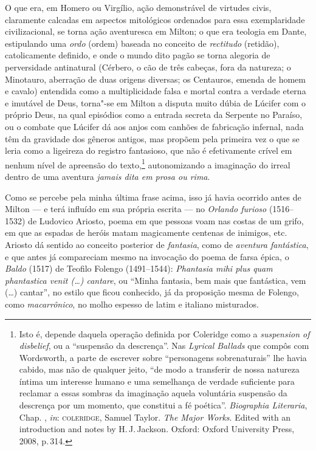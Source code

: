 O que era, em Homero ou Virgílio, ação demonstrável de virtudes civis,
claramente calcadas em aspectos mitológicos ordenados para essa
exemplaridade civilizacional, se torna ação aventuresca em Milton; o que
era teologia em Dante, estipulando uma \emph{ordo} (ordem) baseada no
conceito de \emph{rectitudo} (retidão), catolicamente definido, e onde o
mundo dito pagão se torna alegoria de perversidade antinatural (Cérbero,
o cão de três cabeças, fora da natureza; o Minotauro, aberração de duas
origens diversas; os Centauros, emenda de homem e cavalo) entendida como
a multiplicidade falsa e mortal contra a verdade eterna e imutável de
Deus, torna"-se em Milton a disputa muito dúbia de Lúcifer com o próprio
Deus, na qual episódios como a entrada secreta da Serpente no Paraíso,
ou o combate que Lúcifer dá aos anjos com canhões de fabricação
infernal, nada têm da gravidade dos gêneros antigos, mas propõem pela
primeira vez o que se leria como a ligeireza do registro fantasioso, que
não é efetivamente crível em nenhum nível de apreensão do
texto,\footnote{Isto é, depende daquela operação definida por Coleridge
  como a \emph{suspension of disbelief}, ou a ``suspensão da
  descrença''. Nas \emph{Lyrical Ballads} que compôs com Wordsworth, a
  parte de escrever sobre ``personagens sobrenaturais'' lhe havia
  cabido, mas não de qualquer jeito, ``de modo a transferir de nossa
  natureza íntima um interesse humano e uma semelhança de verdade
  suficiente para reclamar a essas sombras da imaginação aquela
  voluntária suspensão da descrença por um momento, que constitui a fé
  poética''. \emph{Biographia Literaria}, Chap. , \emph{in}:
  \textsc{coleridge}, Samuel Taylor. \emph{The Major Works}. Edited with an
  introduction and notes by H.\,J.\,Jackson. Oxford: Oxford University
  Press, 2008, p.\,314.} autonomizando a imaginação do irreal dentro de
uma aventura \emph{jamais dita em prosa ou rima}.

Como se percebe pela minha última frase acima, isso já havia ocorrido
antes de Milton --- e terá influído em sua própria escrita --- no
\emph{Orlando furioso} (1516--1532) de Ludovico Ariosto, poema em que
pessoas voam nas costas de um grifo, em que as espadas de heróis matam
magicamente centenas de inimigos, etc. Ariosto dá sentido ao conceito
posterior de \emph{fantasia}, como de \emph{aventura fantástica}, e que
antes já compareciam mesmo na invocação do poema de farsa épica, o
\emph{Baldo} (1517) de Teofilo Folengo (1491--1544): \emph{Phantasia mihi
plus quam phantastica venit (\ldots{}) cantare}, ou ``Minha fantasia, bem
mais que fantástica, vem (\ldots{}) cantar'', no estilo que ficou conhecido,
já da proposição mesma de Folengo, como \emph{macarrônico}, no molho
espesso de latim e italiano misturados.


